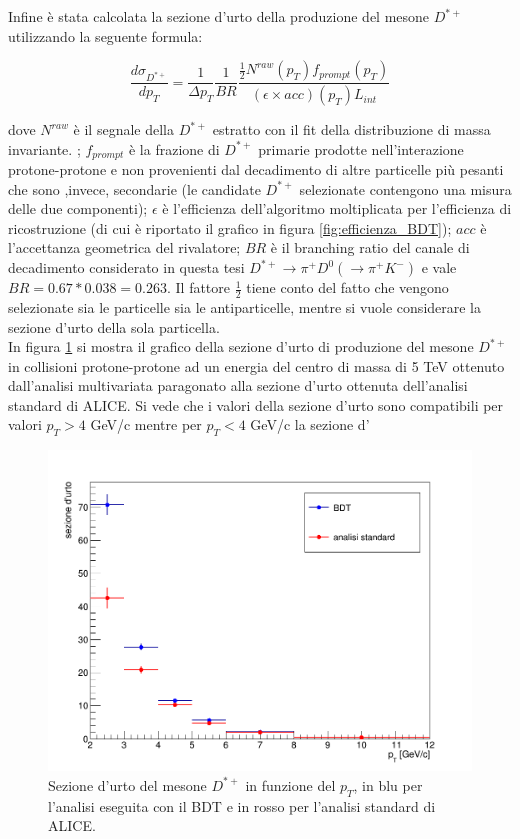 
\iffalse

Infine è stata calcolata la sezione d'urto  della produzione del mesone $D^{*+}$  utilizzando la seguente formula:

    \begin{equation}
        \frac{d\sigma_{D^{*+}}}{dp_T} = \frac{1}{\Delta p_T} \frac{1}{BR} \frac{\frac{1}{2} N^{raw}(p_T) f_{prompt}(p_T)}{(\epsilon \times acc)(p_T) L_{int}}
    \end{equation}
    
dove $N^{raw}$ è il segnale della $D^{*+}$ estratto con il fit della distribuzione di massa invariante. ; $f_{prompt}$ è la frazione di $D^{*+}$ primarie prodotte nell'interazione protone-protone e non provenienti dal decadimento di altre particelle più pesanti che sono ,invece, secondarie (le candidate $D^{*+}$ selezionate contengono una misura delle due componenti); $\epsilon$ è l'efficienza dell'algoritmo moltiplicata per l'efficienza di ricostruzione (di cui è riportato il grafico in figura \ref{fig:efficienza_BDT}); $acc$ è l'accettanza geometrica del rivalatore; $BR$ è il branching ratio del canale di decadimento considerato in questa tesi $D^{*+} \rightarrow \pi^+ D^0(\rightarrow \pi^+ K^-)$ e vale $BR = 0.67 * 0.038 = 0.263 $. Il fattore $\frac{1}{2}$ tiene conto del fatto che vengono selezionate sia le particelle sia le antiparticelle, mentre si vuole considerare la sezione d'urto della sola particella.  
\\In figura \ref{fig:sezioneUrto} si mostra il grafico della sezione d'urto di produzione del mesone $D^{*+}$ in collisioni protone-protone ad un energia del centro di massa di 5 TeV ottenuto dall'analisi multivariata paragonato alla sezione d'urto ottenuta dell'analisi standard di ALICE. Si vede che i valori della sezione d'urto sono compatibili per valori $p_T > 4$ GeV/c mentre per $p_T < 4$ GeV/c la sezione d'
 
 
 \begin{figure}[htbp] 
        \centering
        \includegraphics[width=0.8\linewidth]{AnalisiDati/sezioneUrto.png}
        \caption{Sezione d'urto del mesone $D^{*+}$ in funzione del $p_T$, in blu per l'analisi eseguita con il BDT e in rosso per l'analisi standard di ALICE.}
        \label{fig:sezioneUrto}
    \end{figure}
   
